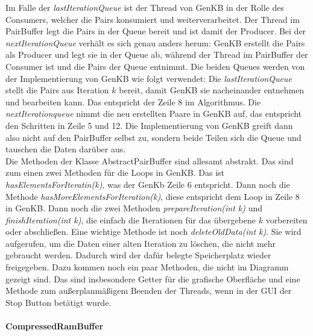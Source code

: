\documentclass[12pt,a4paper]{article}
\begin{document}
Im Falle der \textit{lastIterationQueue} ist der Thread von GenKB in der Rolle des Consumers, welcher die Pairs konsumiert und weiterverarbeitet. Der Thread im PairBuffer legt die Pairs in der Queue bereit und ist damit der Producer. Bei der \textit{nextIterationQueue} verhält es sich genau anders herum: GenKB erstellt die Pairs als Producer und legt sie in der Queue ab, während der Thread im PairBuffer der Consumer ist und die Pairs der Queue entnimmt. Die beiden Queues werden von der Implementierung von GenKB wie folgt verwendet: Die \textit{lastIterationQueue} stellt die Pairs aus Iteration $k$ bereit, damit GenKB sie nacheinander entnehmen und bearbeiten kann. Das entspricht der Zeile 8 im Algorithmus. Die \textit{nextIterationqueue} nimmt die neu erstellten Paare in GenKB auf, das entspricht den Schritten in Zeile 5 und 12. Die Implementierung von GenKB greift dann also nicht auf den PairBuffer selbst zu, sondern beide Teilen sich die Queue und tauschen die Daten darüber aus. \\
Die Methoden der Klasse AbstractPairBuffer sind allesamt abstrakt. Das sind zum einen zwei Methoden für die Loops in GenKB. Das ist \textit{hasElementsForIteratin(k)}, was der GenKb Zeile 6 entspricht. Dann noch die Methode \textit{hasMoreElementsForIteration(k)}, diese entspricht dem Loop in Zeile 8 in GenKB. Dann noch die zwei Methoden \textit{prepareIteration(int k)} und \textit{finishIteration(int k)}, die einfach die Iterationen für das übergebene $k$ vorbereiten oder abschließen. Eine wichtige Methode ist noch \textit{deleteOldData(int k)}. Sie wird aufgerufen, um die Daten einer alten Iteration zu löschen, die nicht mehr gebraucht werden. Dadurch wird der dafür belegte Speicherplatz wieder freigegeben. Dazu kommen noch ein paar Methoden, die nicht im Diagramm gezeigt sind. Das sind insbesondere Getter für die grafische Oberfläche und eine Methode zum außerplanmäßigem Beenden der Threads, wenn in der GUI der Stop Button betätigt wurde.



\paragraph{CompressedRamBuffer}\mbox{}
\label{sec:compressedrambuffer}
\end{document}
